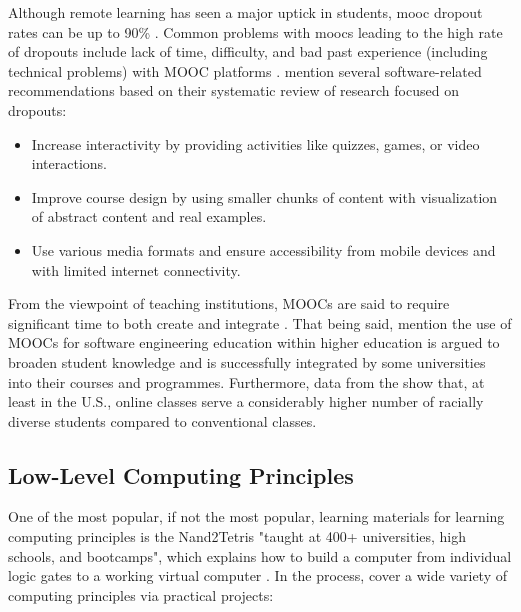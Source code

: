 Although remote learning has seen a major uptick in students, \gls{mooc} dropout rates can be up to 90\% \parencite{goopio_mooc_2021}.
Common problems with \glspl{mooc} leading to the high rate of dropouts include lack of time, difficulty, and bad past experience (including technical problems) with MOOC platforms \parencite{onah2014dropout}.
\textcite{goopio_mooc_2021} mention several software-related recommendations based on their systematic review of research focused on dropouts:

\begin{itemize}
    \item Increase interactivity by providing activities like quizzes, games, or video interactions.
    \item Improve course design by using smaller chunks of content with visualization of abstract content and real examples.
    \item Use various media formats and ensure accessibility from mobile devices and with limited internet connectivity.
\end{itemize}

From the viewpoint of teaching institutions, MOOCs are said to require significant time to both create and integrate \parencite{stikkolorum2014mooc}.
That being said, \textcite{stikkolorum2014mooc} mention the use of MOOCs for software engineering education within higher education is argued to broaden student knowledge and is successfully integrated by some universities into their courses and programmes.
Furthermore, data from the \textcite{us_doe_digest_2021} show that, at least in the U.S., online classes serve a considerably higher number of racially diverse students compared to conventional classes.

\subsection{Low-Level Computing Principles}

One of the most popular, if not the most popular, learning materials for learning computing principles is the Nand2Tetris "taught at 400+ universities, high schools, and bootcamps", which explains how to build a computer from individual logic gates to a working virtual computer \parencite{nand2tetrisweb}.
In the process, \textcite{nand2tetris} cover a wide variety of computing principles via practical projects:

